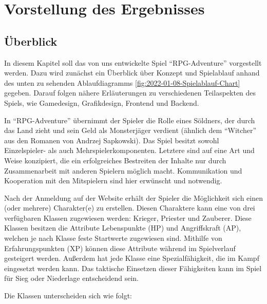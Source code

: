 

\section{Vorstellung des Ergebnisses}

\subsection{Überblick}
In diesem Kapitel soll das von uns entwickelte Spiel \enquote{RPG-Adventure} vorgestellt werden. Dazu wird zunächst ein Überblick über Konzept und Spielablauf anhand des unten zu sehenden Ablaufdiagramms \ref{fig:2022-01-08-Spielablauf-Chart} gegeben. Darauf folgen nähere Erläuterungen zu verschiedenen Teilaspekten des Spiels, wie Gamedesign, Grafikdesign, Frontend und Backend. 

In \enquote{RPG-Adventure} übernimmt der Spieler die Rolle eines Söldners, der durch das Land zieht und sein Geld als Monsterjäger verdient (ähnlich dem \enquote{Witcher} aus den Romanen von Andrzej Sapkowski). Das Spiel besitzt sowohl Einzelspieler- als auch Mehrspielerkomponenten. Letztere sind auf eine Art und Weise konzipiert, die ein erfolgreiches Bestreiten der Inhalte nur durch Zusammenarbeit mit anderen Spielern möglich macht. Kommunikation und Kooperation mit den Mitspielern sind hier erwünscht und notwendig. 

Nach der Anmeldung auf der Website erhält der Spieler die Möglichkeit sich einen (oder mehrere) Charakter(e) zu erstellen. Diesen Charaktere kann eine von drei verfügbaren Klassen zugewiesen werden: Krieger, Priester und Zauberer. Diese Klassen besitzen die Attribute Lebenspunkte (HP) und Angriffskraft (AP), welchen je nach Klasse feste Startwerte zugewiesen sind. Mithilfe von Erfahrungspunkten (XP) können diese Attribute während im Spielverlauf gesteigert werden. Außerdem hat jede Klasse eine Spezialfähigkeit, die im Kampf eingesetzt werden kann. Das taktische Einsetzen dieser Fähigkeiten kann im Spiel für Sieg oder Niederlage entscheidend sein.

Die Klassen unterscheiden sich wie folgt:

